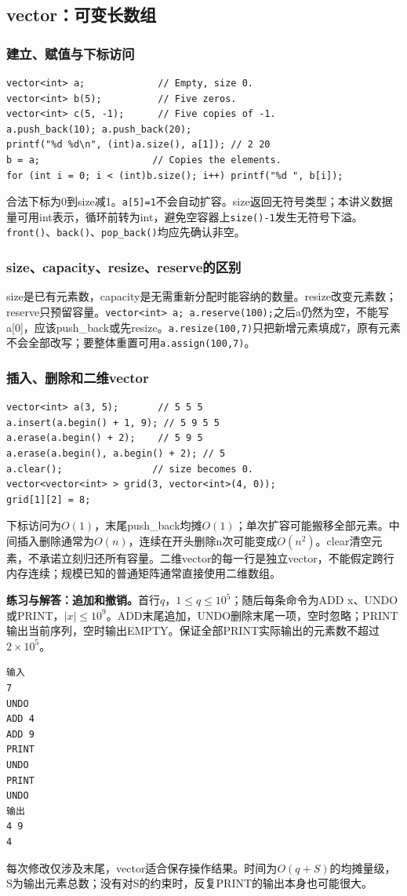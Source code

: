 \subsection{vector：可变长数组}
\subsubsection{建立、赋值与下标访问}
\begin{lstlisting}
vector<int> a;             // Empty, size 0.
vector<int> b(5);          // Five zeros.
vector<int> c(5, -1);      // Five copies of -1.
a.push_back(10); a.push_back(20);
printf("%d %d\n", (int)a.size(), a[1]); // 2 20
b = a;                    // Copies the elements.
for (int i = 0; i < (int)b.size(); i++) printf("%d ", b[i]);
\end{lstlisting}
合法下标为0到size减1。\texttt{a[5]=1}不会自动扩容。size返回无符号类型；本讲义数据量可用int表示，循环前转为int，避免空容器上\texttt{size()-1}发生无符号下溢。\texttt{front()}、\texttt{back()}、\texttt{pop\_back()}均应先确认非空。

\subsubsection{size、capacity、resize、reserve的区别}
size是已有元素数，capacity是无需重新分配时能容纳的数量。resize改变元素数；reserve只预留容量。\texttt{vector<int> a; a.reserve(100);}之后a仍然为空，不能写a[0]，应该push\_back或先resize。\texttt{a.resize(100,7)}只把新增元素填成7，原有元素不会全部改写；要整体重置可用\texttt{a.assign(100,7)}。

\subsubsection{插入、删除和二维vector}
\begin{lstlisting}
vector<int> a(3, 5);       // 5 5 5
a.insert(a.begin() + 1, 9); // 5 9 5 5
a.erase(a.begin() + 2);    // 5 9 5
a.erase(a.begin(), a.begin() + 2); // 5
a.clear();                // size becomes 0.
vector<vector<int> > grid(3, vector<int>(4, 0));
grid[1][2] = 8;
\end{lstlisting}
下标访问为$O(1)$，末尾push\_back均摊$O(1)$；单次扩容可能搬移全部元素。中间插入删除通常为$O(n)$，连续在开头删除n次可能变成$O(n^2)$。clear清空元素，不承诺立刻归还所有容量。二维vector的每一行是独立vector，不能假定跨行内存连续；规模已知的普通矩阵通常直接使用二维数组。

\textbf{练习与解答：追加和撤销。}首行$q$，$1\le q\le10^5$；随后每条命令为ADD x、UNDO或PRINT，$|x|\le10^9$。ADD末尾追加，UNDO删除末尾一项，空时忽略；PRINT输出当前序列，空时输出EMPTY。保证全部PRINT实际输出的元素数不超过$2\times10^5$。
\begin{verbatim}
输入
7
UNDO
ADD 4
ADD 9
PRINT
UNDO
PRINT
UNDO
输出
4 9
4
\end{verbatim}
每次修改仅涉及末尾，vector适合保存操作结果。时间为$O(q+S)$的均摊量级，S为输出元素总数；没有对S的约束时，反复PRINT的输出本身也可能很大。

